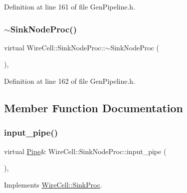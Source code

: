 Definition at line 161 of file Gen\+Pipeline.\+h.

\mbox{\label{class_wire_cell_1_1_sink_node_proc_a28940b145d90dfa7fabfa1407ab617f6}} 
\subsubsection{\texorpdfstring{$\sim$\+Sink\+Node\+Proc()}{~SinkNodeProc()}}
{\footnotesize\ttfamily virtual Wire\+Cell\+::\+Sink\+Node\+Proc\+::$\sim$\+Sink\+Node\+Proc (\begin{DoxyParamCaption}{ }\end{DoxyParamCaption})\hspace{0.3cm}{\ttfamily [inline]}, {\ttfamily [virtual]}}



Definition at line 162 of file Gen\+Pipeline.\+h.



\subsection{Member Function Documentation}
\mbox{\label{class_wire_cell_1_1_sink_node_proc_a7a663013b7c3dc008f55eac98a683de3}} 
\subsubsection{\texorpdfstring{input\+\_\+pipe()}{input\_pipe()}}
{\footnotesize\ttfamily virtual \hyperlink{namespace_wire_cell_afce9bb01c731347c3d4c8ca9d4ed804f}{Pipe}\& Wire\+Cell\+::\+Sink\+Node\+Proc\+::input\+\_\+pipe (\begin{DoxyParamCaption}{ }\end{DoxyParamCaption})\hspace{0.3cm}{\ttfamily [inline]}, {\ttfamily [virtual]}}



Implements \hyperlink{class_wire_cell_1_1_sink_proc_a47ec8c790457ad63e9d0bb9b1b7da935}{Wire\+Cell\+::\+Sink\+Proc}.



